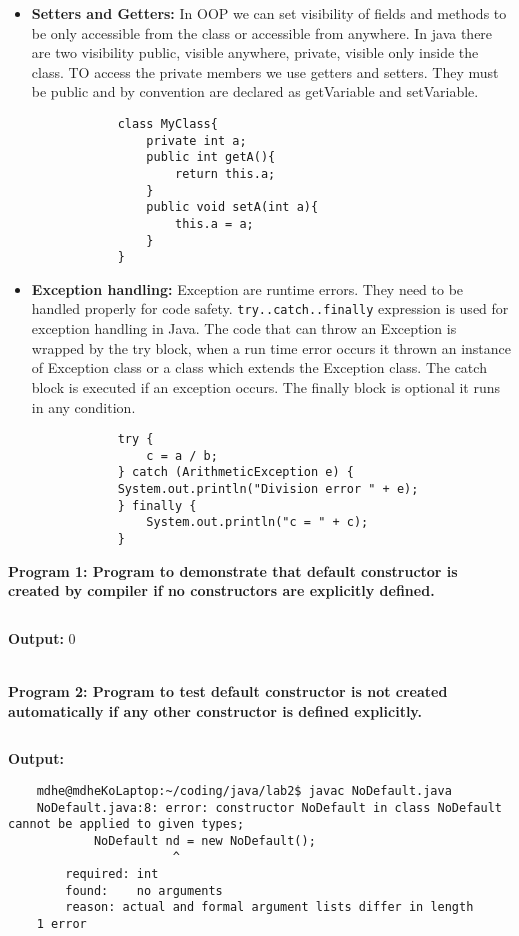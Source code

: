 \documentclass{book}
\begin{document}
\begin{itemize}
    \item{\textbf{Setters and Getters:}}
        In OOP we can set visibility of fields and methods to be only accessible from the class or accessible from anywhere. In java there are two visibility public, visible anywhere, private, visible only inside the class.
        TO access the private members we use getters and setters. They must be public and by convention are declared as getVariable and setVariable.
        \begin{verbatim}
            class MyClass{
                private int a;
                public int getA(){
                    return this.a;
                }
                public void setA(int a){
                    this.a = a;
                }
            }
        \end{verbatim}
    \item{\textbf{Exception handling:}}
        Exception are runtime errors. They need to be handled properly for code safety. \verb|try..catch..finally| expression is used for exception handling in Java.
        The code that can throw an Exception is wrapped by the try block, when a run time error occurs it thrown an instance of Exception class or a class which extends the Exception class.
        The catch block is executed if an exception occurs. The finally block is optional it runs in any condition.
        \begin{verbatim}
            try {
                c = a / b;
            } catch (ArithmeticException e) {
            System.out.println("Division error " + e);
            } finally {
                System.out.println("c = " + c);
            }
        \end{verbatim}
\end{itemize}
\newpage
\par
\textbf{Program 1: Program to demonstrate that default constructor is created by compiler if no constructors are explicitly defined.}
\inputminted{java}{DefaultConstructor.java}
\par
\textbf{Output:}
0
\\
\\
\par
\textbf{Program 2: Program to test default constructor is not  created automatically if any other constructor is defined explicitly.}
\inputminted{java}{NoDefault.java}
\par
\textbf{Output:}
\begin{verbatim}
    mdhe@mdheKoLaptop:~/coding/java/lab2$ javac NoDefault.java
    NoDefault.java:8: error: constructor NoDefault in class NoDefault cannot be applied to given types;
            NoDefault nd = new NoDefault();
                       ^
        required: int
        found:    no arguments
        reason: actual and formal argument lists differ in length
    1 error
\end{verbatim}
\end{document}
